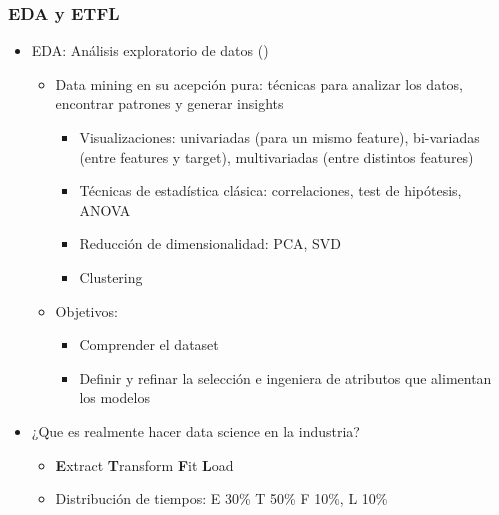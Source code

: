\documentclass[leqno, 10pt, envcountsect]{beamer}
\numberwithin{equation}{section}
\theoremstyle{definition}
\theoremstyle{example}
\numberwithin{figure}{section}
\numberwithin{table}{section}
\let\olditem\item
\renewcommand{\item}{%
\olditem\vspace{1pt}}
\begin{document}
\begin{frame}
  \frametitle{EDA y ETFL}
  \begin{itemize}
    \item EDA: Análisis exploratorio de datos  (\textcite{tukey77})
      \begin{itemize}
        \item Data mining en su acepción pura: técnicas para analizar
          los datos, encontrar patrones y generar insights
          \begin{itemize}
            \item Visualizaciones: univariadas (para un mismo feature),
              bi-variadas (entre features y target), multivariadas (entre
              distintos features)
            \item Técnicas de estadística clásica: correlaciones, test de
              hipótesis, ANOVA
            \item Reducción de dimensionalidad: PCA, SVD
            \item Clustering
          \end{itemize}
        \item Objetivos:
          \begin{itemize}
            \item Comprender el dataset
            \item Definir y refinar la selección e ingeniera de atributos que
              alimentan los modelos
          \end{itemize}
      \end{itemize}
  \end{itemize}

  \begin{itemize}
    \item ¿Que es realmente hacer data science en la industria?
      \begin{itemize}
        \item \textbf{E}xtract \textbf{T}ransform \textbf{F}it \textbf{L}oad
        \item Distribución de tiempos: E 30\% T 50\% F 10\%, L 10\%
      \end{itemize}
  \end{itemize}
\end{frame}
\end{document}
